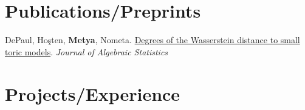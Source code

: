 \section{Publications/Preprints}





\begin{etaremune}[leftmargin=13pt]
\item {\color{grey}DePaul, Ho\c{s}ten, \textbf{Metya}, Nometa}. \href{https://arxiv.org/abs/2402.09626}{Degrees of the Wasserstein distance to small toric models}.
\textit{Journal of Algebraic Statistics}
\end{etaremune}
\vspace{\mygap}


\section{Projects/Experience}
\resumeSubHeadingListStart



